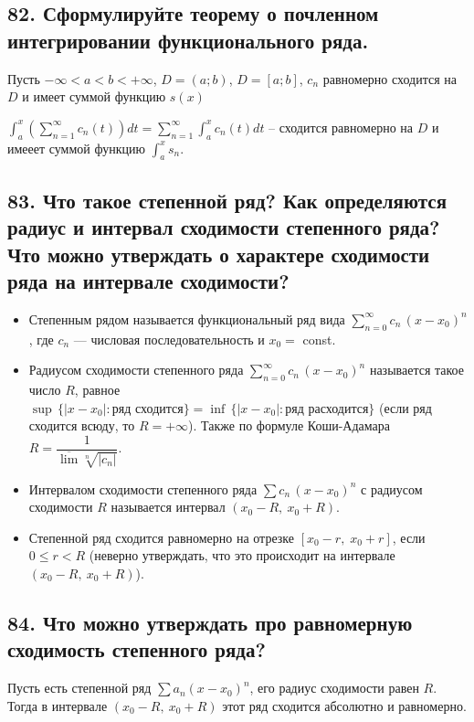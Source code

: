 \documentclass[a4paper, fleqn]{article}
\begin{document}
        \subsection*{82. Сформулируйте теорему о почленном интегрировании функционального ряда.}
        Пусть $-\infty < a < b < +\infty$, $D= (a; b)$, $D = [a; b]$, $c_n$ равномерно сходится на $D$ и имеет суммой функцию $s(x)$

        $\int_{a}^{x}\left(\sum_{n=1}^{\infty} c_n(t)\right) dt = \sum_{n=1}^{\infty} \int_{a}^{x} c_n(t) dt$ -- сходится равномерно на $D$ и имееет суммой функцию $\int_a^x s_n$.
    
    \subsection*{83. Что такое степенной ряд? Как определяются радиус и интервал сходимости степенного ряда? 
    Что можно утверждать о характере сходимости ряда на интервале сходимости?}

    \begin{itemize}
        \item Степенным рядом называется функциональный ряд вида $\sum \limits_{n = 0}^{\infty} c_n \, (x - x_0)^n$, 
    где $c_n$ --- числовая последовательность и $x_0 =$ const.

        \item Радиусом сходимости степенного ряда $\sum \limits_{n = 0}^{\infty} c_n \, (x - x_0)^n$ называется такое число $R$,
    равное \\ ${\sup \, \bigl\{|x - x_0| : \text{ряд сходится}\bigr\}} = {\inf \, \bigl\{|x - x_0| : \text{ряд расходится}\bigr\}}$
    (если ряд сходится всюду, то ${R = +\infty}$). Также по формуле Коши-Адамара $R = \dfrac1{\overline{\lim} \sqrt[n]{|c_n|}}$.

        \item Интервалом сходимости степенного ряда $\sum c_n \, (x - x_0)^n$ с радиусом сходимости $R$ называется интервал $(x_0 - R, \: x_0 + R)$.

        \item Степенной ряд сходится равномерно на отрезке $[x_0 - r, \; x_0 + r]$, если $0 \leqslant r < R$ 
    (неверно утверждать, что это происходит на интервале $(x_0 - R, \: x_0 + R)$). 
    \end{itemize}
        
    \subsection*{84. Что можно утверждать про равномерную сходимость степенного ряда?}
    Пусть есть степенной ряд $\sum a_n \left(x - x_0\right)^n$, его радиус сходимости равен $R$. Тогда в интервале $\left(x_0 - R,\ x_0 + R\right)$ этот ряд сходится абсолютно и равномерно.
        
\end{document}

